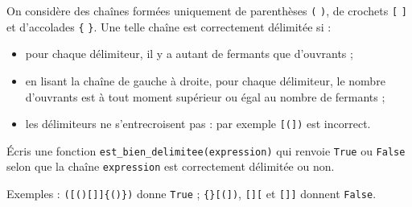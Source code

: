 On considère des chaînes formées uniquement de parenthèses \texttt{(} \texttt{)}, de crochets \texttt{[} \texttt{]} et d'accolades \texttt{\{} \texttt{\}}. Une telle chaîne est correctement délimitée si :
\begin{itemize}
\item pour chaque délimiteur, il y a autant de fermants que d'ouvrants ;
\item en lisant la chaîne de gauche à droite, pour chaque délimiteur, le nombre d'ouvrants est à tout moment supérieur ou égal au nombre de fermants ;
\item les délimiteurs ne s'entrecroisent pas : par exemple \texttt{[(])} est incorrect.
\end{itemize}
Écris une fonction \texttt{est\_bien\_delimitee(expression)} qui renvoie \texttt{True} ou \texttt{False} selon que la chaîne \texttt{expression} est correctement délimitée ou non.

Exemples : \texttt{([()[]]\{()\})} donne \texttt{True} ; \texttt{\{\}[(])}, \texttt{[][} et \texttt{[]]} donnent \texttt{False}.
